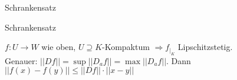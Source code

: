 \documentclass[class=article, crop=false]{standalone}
\begin{document}
\begin{zettel}{Schrankensatz}
\begin{flashcard}[vnoxaixc]{Schrankensatz}
	\begin{theorem}[Schrankensatz]
		$f: U \to W$ wie oben,  $U\supseteq K$-Kompaktum $\Rightarrow f _{\big | _{K} } $ Lipschitzstetig. \\
		Genauer: $|| Df || = \sup || D_af || = \max || D_af || .$ Dann $|| f(x) - f(y) || \leq || Df || \cdot || x - y ||  $
	\end{theorem}
\end{flashcard}
\end{zettel}
\end{document}
